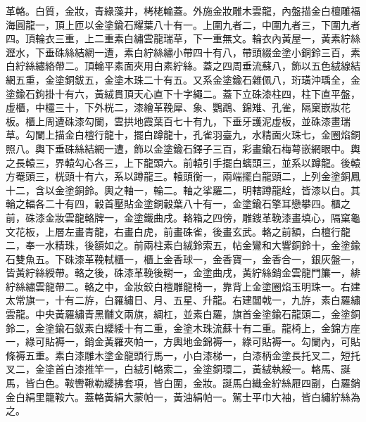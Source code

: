 \begin{pinyinscope}
 革輅。白質，金妝，青綠藻井，栲栳輪蓋。外施金妝雕木雲龍，內盤描金白檀雕福海圓龍一，頂上匝以金塗鍮石耀葉八十有一。上圍九者二，中圍九者三，下圍九者四。頂輪衣三重，上二重素白繡雲龍瑞草，下一重無文。輪衣內黃屋一，黃素紵絲瀝水，下垂硃絲結網一遭，素白紵絲繡小帶四十有八，帶頭綴金塗小銅鈴三百，素白紵絲繡絡帶二。頂輪平素面夾用白素紵絲。蓋之四周垂流蘇八，飾以五色絨線結網五重，金塗銅鈸五，金塗木珠二十有五。又系金塗鍮石雜佩八，珩璜沖瑀全，金塗鍮石鉤掛十有六，黃絨貫頂天心直下十字繩二。蓋下立硃漆柱四，柱下直平盤，虛櫃，中欞三十，下外桄二，漆繪革鞔犀、象、鸚鵡、錦雉、孔雀，隔窠嵌妝花板。櫃上周遭硃漆勾闌，雲拱地霞葉百七十有九，下垂牙護泥虛板，並硃漆畫瑞草。勾闌上描金白檀行龍十，擺白蹲龍十，孔雀羽臺九，水精面火珠七，金圈焰銅照八。輿下垂硃絲結網一遭，飾以金塗鍮石鐸子三百，彩畫鍮石梅萼嵌網眼中。輿之長轅三，界轅勾心各三，上下龍頭六。前轅引手擺白螭頭三，並系以蹲龍。後轅方罨頭三，桄頭十有六，系以蹲龍三。轅頭衡一，兩端擺白龍頭二，上列金塗銅鳳十二，含以金塗銅鈴。輿之軸一，輪二。軸之挲羅二，明轄蹲龍絟，皆漆以白。其輪之輻各二十有四，轂首壓貼金塗銅轂葉八十有一，金塗鍮石擎耳戀攀四。櫃之前，硃漆金妝雲龍輅牌一，金塗鐵曲戌。輅箱之四傍，雕鎪革鞔漆畫填心，隔窠龜文花板，上層左畫青龍，右畫白虎，前畫硃雀，後畫玄武。輅之前額，白檀行龍二，奉一水精珠，後額如之。前兩柱素白絨鈴索五，帖金鸞和大響銅鈴十，金塗鍮石雙魚五。下硃漆革鞔軾櫃一，櫃上金香球一，金香寶一，金香合一，銀灰盤一，皆黃紵絲綬帶。輅之後，硃漆革鞔後轛一，金塗曲戌，黃紵絲銷金雲龍門簾一，緋紵絲繡雲龍帶二。輅之中，金妝鉸白檀雕龍椅一，靠背上金塗圈焰玉明珠一。右建太常旗一，十有二斿，白羅繡日、月、五星、升龍。右建闒戟一，九斿，素白羅繡雲龍。中央黃羅繡青黑黼文兩旗，綢杠，並素白羅，旗首金塗鍮石龍頭二，金塗銅鈴二，金塗鍮石鈸素白纓緌十有二重，金塗木珠流蘇十有二重。龍椅上，金錦方座一，綠可貼褥一，銷金黃羅夾帕一，方輿地金錦褥一，綠可貼褥一。勾闌內，可貼條褥五重。素白漆雕木塗金龍頭行馬一，小白漆梯一，白漆柄金塗長托叉二，短托叉二，金塗首白漆推竿一，白絨引輅索二，金塗銅環二，黃絨執綏一。輅馬、誕馬，皆白色。鞍轡鞦勒纓拂套項，皆白圍，金妝。誕馬白織金紵絲屜四副，白羅銷金白絹里籠鞍六。蓋輅黃絹大蒙帕一，黃油絹帕一。駕士平巾大袖，皆白繡紵絲為之。




\end{pinyinscope}
